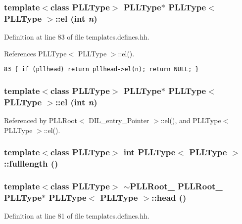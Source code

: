 \subsubsection{\setlength{\rightskip}{0pt plus 5cm}template$<$class PLLType$>$ PLLType$\ast$ PLLType$<$ PLLType $>$::el (int {\em n})\hspace{0.3cm}{\tt  [inline]}}\label{classPLLType_a15}




Definition at line 83 of file templates.defines.hh.

References PLLType$<$ PLLType $>$::el().



\footnotesize\begin{verbatim}83 { if (pllhead) return pllhead->el(n); return NULL; } 
\end{verbatim}\normalsize 
{}
\subsubsection{\setlength{\rightskip}{0pt plus 5cm}template$<$class PLLType$>$ PLLType$\ast$ PLLType$<$ PLLType $>$::el (int {\em n})\hspace{0.3cm}{\tt  [inline]}}\label{classPLLType_a5}




Referenced by PLLRoot$<$ DIL\_\-entry\_\-Pointer $>$::el(), and PLLType$<$ PLLType $>$::el().
\subsubsection{\setlength{\rightskip}{0pt plus 5cm}template$<$class PLLType$>$ int PLLType$<$ PLLType $>$::fulllength ()\hspace{0.3cm}{\tt  [inline]}}\label{classPLLType_a9}


\subsubsection{\setlength{\rightskip}{0pt plus 5cm}template$<$class PLLType$>$ $\sim$PLLRoot\_\- PLLRoot\_\- PLLType$\ast$ PLLType$<$ PLLType $>$::head ()\hspace{0.3cm}{\tt  [inline]}}\label{classPLLType_a13}




Definition at line 81 of file templates.defines.hh.



